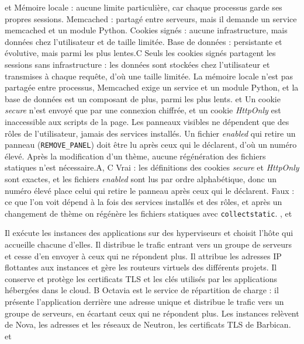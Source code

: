   { et }
  {Mémoire locale : aucune limite particulière, car chaque processus garde ses propres sessions.}
  {Memcached : partagé entre serveurs, mais il demande un service memcached et un module Python.}
  {Cookies signés : aucune infrastructure, mais données chez l'utilisateur et de taille limitée.}
  {Base de données : persistante et évolutive, mais parmi les plus lentes.}{C}
  {Seuls les cookies signés partagent les sessions sans infrastructure : les données sont stockées chez l'utilisateur et transmises à chaque requête, d'où une taille limitée. La mémoire locale n'est pas partagée entre processus, Memcached exige un service et un module Python, et la base de données est un composant de plus, parmi les plus lents.}
  { et }
  {Un cookie \emph{secure} n'est envoyé que par une connexion chiffrée, et un cookie \emph{HttpOnly} est inaccessible aux scripts de la page.}
  {Les panneaux visibles ne dépendent que des rôles de l'utilisateur, jamais des services installés.}
  {Un fichier \emph{enabled} qui retire un panneau (\texttt{REMOVE\_PANEL}) doit être lu après ceux qui le déclarent, d'où un numéro élevé.}
  {Après la modification d'un thème, aucune régénération des fichiers statiques n'est nécessaire.}{A, C}
  {Vrai : les définitions des cookies \emph{secure} et \emph{HttpOnly} sont exactes, et les fichiers \emph{enabled} sont lus par ordre alphabétique, donc un numéro élevé place celui qui retire le panneau après ceux qui le déclarent. Faux : ce que l'on voit dépend à la fois des services installés et des rôles, et après un changement de thème on régénère les fichiers statiques avec \texttt{collectstatic}.}
  {,  et }


  {Il exécute les instances des applications sur des hyperviseurs et choisit l'hôte qui accueille chacune d'elles.}
  {Il distribue le trafic entrant vers un groupe de serveurs et cesse d'en envoyer à ceux qui ne répondent plus.}
  {Il attribue les adresses IP flottantes aux instances et gère les routeurs virtuels des différents projets.}
  {Il conserve et protège les certificats TLS et les clés utilisés par les applications hébergées dans le cloud.}
  {B}
  {Octavia est le service de répartition de charge : il présente l'application derrière une adresse unique et distribue le trafic vers un groupe de serveurs, en écartant ceux qui ne répondent plus. Les instances relèvent de Nova, les adresses et les réseaux de Neutron, les certificats TLS de Barbican.}
  { et }

